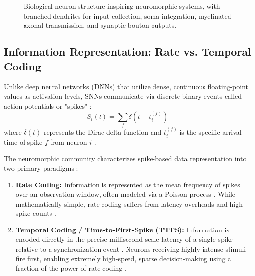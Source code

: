 \documentclass[11pt]{article}
\begin{document}
\begin{figure}[htbp]
{%
    }
    \caption{Biological neuron structure inspiring neuromorphic systems, with branched dendrites for input collection, soma integration, myelinated axonal transmission, and synaptic bouton outputs.}
    \label{fig:biological_neuron}
\end{figure}


\subsection{Information Representation: Rate vs. Temporal Coding}
Unlike deep neural networks (DNNs) that utilize dense, continuous floating-point values as activation levels, SNNs communicate via discrete binary events called action potentials or "spikes" \cite{schuman2017survey,mead1990neuromorphic}:
$$S_i(t) = \sum_f \delta(t - t_i^{(f)})$$
where $\delta(t)$ represents the Dirac delta function and $t_i^{(f)}$ is the specific arrival time of spike $f$ from neuron $i$ \cite{davies2018loihi}. 

The neuromorphic community characterizes spike-based data representation into two primary paradigms \cite{schuman2017survey,mead1990neuromorphic}:
\begin{enumerate}
    \item \textbf{Rate Coding:} Information is represented as the mean frequency of spikes over an observation window, often modeled via a Poisson process \cite{schuman2017survey,mead1990neuromorphic}. While mathematically simple, rate coding suffers from latency overheads and high spike counts \cite{schuman2017survey,mead1990neuromorphic}.
    \item \textbf{Temporal Coding / Time-to-First-Spike (TTFS):} Information is encoded directly in the precise millisecond-scale latency of a single spike relative to a synchronization event \cite{schuman2017survey,mead1990neuromorphic}. Neurons receiving highly intense stimuli fire first, enabling extremely high-speed, sparse decision-making using a fraction of the power of rate coding \cite{schuman2017survey,mead1990neuromorphic}.
\end{enumerate}
\end{document}
